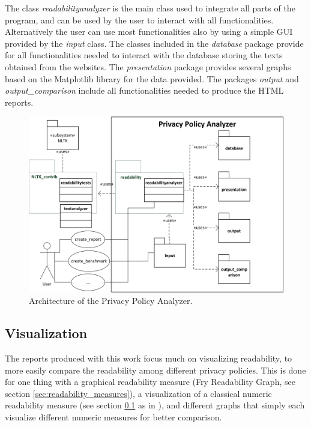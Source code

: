 \documentclass[runningheads,a4paper]{llncs}
\begin{document}
The class \emph{readabilityanalyzer} is the main class used to integrate all parts of the program, and can be used by the user to interact with all functionalities. Alternatively the user can use most functionalities also by using a simple GUI provided by the \emph{input} class. The classes included in the \emph{database} package provide for all functionalities needed to interact with the database storing the texts obtained from the websites. The \emph{presentation} package provides several graphs based on the Matplotlib library for the data provided. The packages \emph{output} and \emph{output\_comparison} include all functionalities needed to produce the HTML reports.

\begin{figure}
\centering
\includegraphics[width=\textwidth]{Bilder/Klassendiagramm.png}
\caption{Architecture of the Privacy Policy Analyzer.}
\label{fig:diagram}
\end{figure}


\subsection{Visualization}\label{sec:visualization}
The reports produced with this work focus much on visualizing readability, to more easily compare the readability among different privacy policies. This is done for one thing with a graphical readability measure (Fry Readability Graph, see section \ref{sec:readability_measures}), a visualization of a classical numeric readability measure (see section \ref{sec:visualization}  as in \cite{Karmakar2010}), and different graphs that simply each visualize different numeric measures for better comparison.
\end{document}
